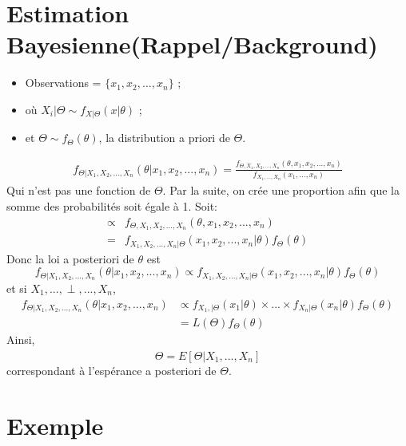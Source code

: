 \section{Estimation Bayesienne(Rappel/Background)}
\label{sec:theo:bayes}
\begin{itemize}
\item Observations = $\lbrace x_1, x_2, ..., x_n \rbrace$ ;
\item où $X_i|\Theta \sim f_{X|\Theta}(x|\theta)$ ;
\item et $\Theta \sim f_{\Theta}(\theta)$, la distribution a priori de $\Theta$.
\end{itemize}
\begin{align*}
 f_{\Theta|X_1, X_2, ..., X_n}(\theta|x_1, x_2, ..., x_n) = \frac{f_{\Theta,X_1, X_2, ..., X_n}(\theta,x_1, x_2, ..., x_n)}{f_{X_1,...,X_n}(x_1,...,x_n)}
\end{align*}
Qui n'est pas une fonction de $\Theta$. Par la suite, on crée une proportion afin que la somme des probabilités soit égale à 1.
 Soit:
\begin{align*}
\propto & f_{\Theta,X_1, X_2, ..., X_n}(\theta,x_1, x_2, ..., x_n)\\
=& f_{X_1, X_2, ..., X_n|\Theta}(x_1, x_2, ..., x_n|\theta) f_{\Theta}(\theta)
\end{align*}
Donc la loi a posteriori de $\theta$ est
\begin{equation}
f_{\Theta|X_1, X_2, ..., X_n}(\theta|x_1, x_2, ..., x_n) \propto f_{X_1, X_2, ..., X_n|\Theta}(x_1, x_2, ..., x_n|\theta) f_{\Theta}(\theta)
\end{equation}
et si $X_1,..., \perp,..., X_n$,
\begin{align*}
f_{\Theta|X_1, X_2, ..., X_n}(\theta|x_1, x_2, ..., x_n) &\propto  f_{X_1,|\Theta}(x_1|\theta)\times ...\times f_{X_n|\Theta}(x_n|\theta) f_{\Theta}(\theta)\\
&= L(\Theta)f_{\Theta}(\theta)
\end{align*}
Ainsi, 
\begin{equation}
\widehat{\Theta} = E[\Theta|X_1,...,X_n]
\end{equation}
correspondant à l'espérance a posteriori de $\Theta$.
\section*{Exemple}

